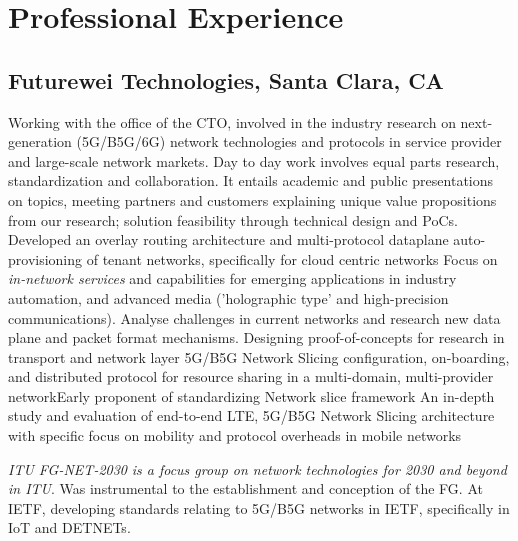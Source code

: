 \documentclass[11pt,a4paper,sans]{moderncv} %
\begin{document}

\section{Professional Experience}
\subsection{Futurewei Technologies, Santa Clara, CA}
{Working with the office of the CTO, involved in the industry research on next-generation (5G/B5G/6G) network technologies and protocols in service provider and large-scale network markets. Day to day work involves equal parts research, standardization and collaboration. It entails academic and public presentations on topics, meeting partners and customers explaining unique value propositions from our research; solution feasibility through technical design and PoCs.\\
}
{Developed an overlay routing architecture and multi-protocol dataplane auto-provisioning of tenant networks, specifically for cloud centric networks}{}
{Focus on \textit{in-network services} and capabilities for emerging applications in industry automation, and advanced media ('holographic type' and high-precision communications). Analyse challenges in current networks and research new data plane and packet format mechanisms. Designing proof-of-concepts for research in transport and network layer}{}
{5G/B5G Network Slicing configuration, on-boarding, and  distributed protocol for resource sharing in a multi-domain, multi-provider network}{Early proponent of standardizing Network slice framework} {}
{An in-depth study and evaluation of end-to-end LTE, 5G/B5G Network Slicing architecture with specific focus on mobility and protocol overheads in mobile networks} {}

 {\textit{ITU FG-NET-2030}}{}{}
 {\emph{is a focus group on network technologies for 2030 and beyond in ITU}. Was instrumental to the establishment and conception of the FG. 
 } {At IETF, developing standards relating to 5G/B5G networks in IETF, specifically in IoT and DETNETs.}
\end{document}
